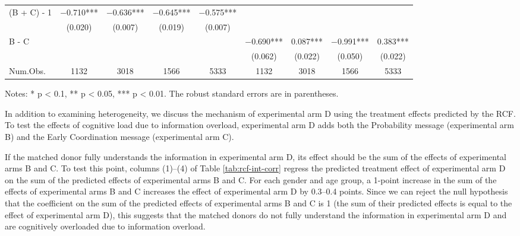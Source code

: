 \documentclass[
  11pt,
  a4paper
]{article}
\begin{document}
\begin{table}
\begin{threeparttable}
\begin{tabular}[t]{lcccccccc}
\hspace{1em}(B + C) - 1 & \num{-0.710}*** & \num{-0.636}*** & \num{-0.645}*** & \num{-0.575}*** &  &  &  & \\
\hspace{1em} & (\num{0.020}) & (\num{0.007}) & (\num{0.019}) & (\num{0.007}) &  &  &  & \\
\hspace{1em}B - C &  &  &  &  & \num{-0.690}*** & \num{0.087}*** & \num{-0.991}*** & \num{0.383}***\\
\hspace{1em} &  &  &  &  & (\num{0.062}) & (\num{0.022}) & (\num{0.050}) & (\num{0.022})\\
\midrule
Num.Obs. & \num{1132} & \num{3018} & \num{1566} & \num{5333} & \num{1132} & \num{3018} & \num{1566} & \num{5333}\\
\bottomrule
\end{tabular}
\begin{tablenotes}
\item Notes: * p < 0.1, ** p < 0.05, *** p < 0.01. The robust standard errors are in parentheses. 
\end{tablenotes}
\end{threeparttable}
\end{table}

In addition to examining heterogeneity, we discuss the mechanism of experimental arm D using the treatment effects predicted by the RCF. To test the effects of cognitive load due to information overload, experimental arm D adds both the Probability message (experimental arm B) and the Early Coordination message (experimental arm C).

If the matched donor fully understands the information in experimental arm D, its effect should be the sum of the effects of experimental arms B and C. To test this point, columns (1)--(4) of Table \ref{tab:rcf-int-corr} regress the predicted treatment effect of experimental arm D on the sum of the predicted effects of experimental arms B and C. For each gender and age group, a 1-point increase in the sum of the effects of experimental arms B and C increases the effect of experimental arm D by 0.3--0.4 points. Since we can reject the null hypothesis that the coefficient on the sum of the predicted effects of experimental arms B and C is 1 (the sum of their predicted effects is equal to the effect of experimental arm D), this suggests that the matched donors do not fully understand the information in experimental arm D and are cognitively overloaded due to information overload.
\end{document}
